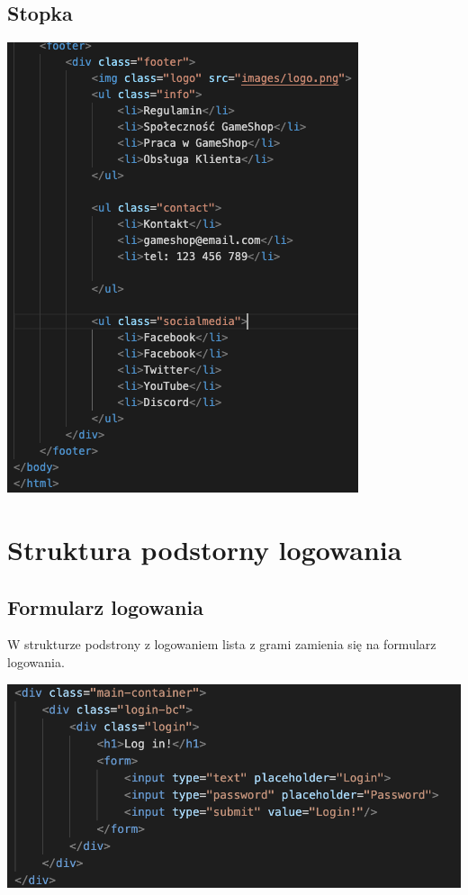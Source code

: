 \documentclass[12pt, letterpaper]{article}
\begin{document}
\subsection{Stopka}

\begin{center}
	\includegraphics[scale=0.5]{footer}
\end{center}

\section{Struktura podstorny logowania}

\subsection{Formularz logowania}
\quad W strukturze podstrony z logowaniem lista z grami zamienia się na formularz logowania.

\begin{center}
	\includegraphics[scale=0.5]{login}
\end{center}
\end{document}
